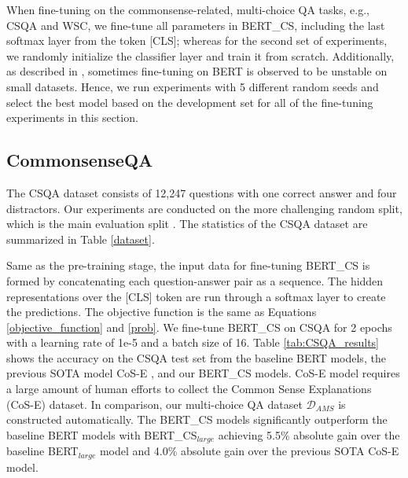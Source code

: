 \documentclass[11pt,a4paper]{article}
\begin{document}
When fine-tuning on the commonsense-related, multi-choice QA tasks, e.g., CSQA and WSC, 
we fine-tune all parameters in BERT\_CS, including the last softmax layer from the token [CLS]; whereas for the second set of experiments, we randomly initialize the classifier layer and train it from scratch. Additionally, as described in \citet{devlin-etal-2019-bert}, sometimes fine-tuning on BERT is observed to be unstable on small datasets. Hence, we run experiments with 5 different random seeds and select the best model based on the development set for all of the fine-tuning experiments in this section.

\subsection{CommonsenseQA}
\label{subsect:csqa}
The CSQA dataset consists of 12,247 questions with one correct answer and four distractors.
Our experiments are conducted on the more challenging random split, which is the main evaluation split \citet{talmor-etal-2019-commonsenseqa}.
The statistics of the CSQA dataset are summarized in Table \ref{dataset}.

Same as the pre-training stage, the input data for fine-tuning BERT\_CS is formed by concatenating each question-answer pair as a sequence. The hidden representations over the [CLS] token are run through a softmax layer to create the predictions.
The objective function is the same as Equations \ref{objective_function} and \ref{prob}.
We fine-tune BERT\_CS on CSQA for 2 epochs with a learning rate of 1e-5 and a batch size of 16. Table \ref{tab:CSQA_results} shows the accuracy on the CSQA test set from the baseline BERT models, the previous SOTA model CoS-E \citep{rajani2019explain}, and our BERT\_CS models. 
CoS-E model requires a large amount of human efforts to collect the Common Sense Explanations (CoS-E) dataset. 
In comparison, our multi-choice QA dataset $\mathcal{D}_{AMS}$ is constructed automatically. The BERT\_CS models significantly outperform the baseline BERT models with BERT\_CS$_{large}$ achieving 5.5\% absolute gain over the baseline BERT$_{large}$ model and 4.0\% absolute gain over the previous SOTA CoS-E model.
\end{document}
